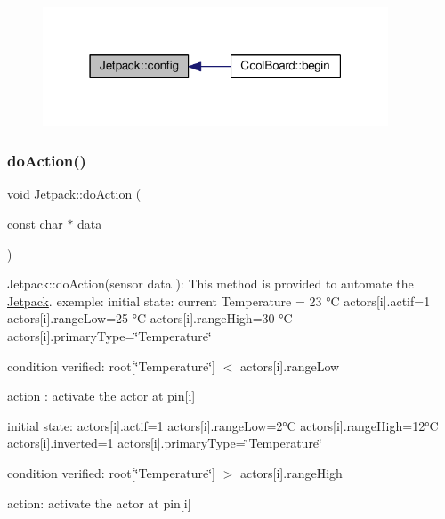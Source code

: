 \begin{figure}[H]
\begin{center}
\leavevmode
\includegraphics[width=291pt]{df/d1d/class_jetpack_ab065ee83e244265a2223a22f3ee4a719_icgraph}
\end{center}
\end{figure}
\mbox{\label{class_jetpack_a9e703197093094b963f9ad57817495b8}} 
\subsubsection{\texorpdfstring{do\+Action()}{doAction()}}
{\footnotesize\ttfamily void Jetpack\+::do\+Action (\begin{DoxyParamCaption}\item[{const char $\ast$}]{data }\end{DoxyParamCaption})}

Jetpack\+::do\+Action(sensor data )\+: This method is provided to automate the \hyperlink{class_jetpack}{Jetpack}. exemple\+: initial state\+: current Temperature = 23 °C actors\mbox{[}i\mbox{]}.actif=1 actors\mbox{[}i\mbox{]}.range\+Low=25 °C actors\mbox{[}i\mbox{]}.range\+High=30 °C actors\mbox{[}i\mbox{]}.primary\+Type=\char`\"{}\+Temperature\char`\"{}

condition verified\+: root\mbox{[}\char`\"{}\+Temperature\char`\"{}\mbox{]} $<$ actors\mbox{[}i\mbox{]}.range\+Low

action \+: activate the actor at pin\mbox{[}i\mbox{]}

initial state\+: actors\mbox{[}i\mbox{]}.actif=1 actors\mbox{[}i\mbox{]}.range\+Low=2°C actors\mbox{[}i\mbox{]}.range\+High=12°C actors\mbox{[}i\mbox{]}.inverted=1 actors\mbox{[}i\mbox{]}.primary\+Type=\char`\"{}\+Temperature\char`\"{}

condition verified\+: root\mbox{[}\char`\"{}\+Temperature\char`\"{}\mbox{]} $>$ actors\mbox{[}i\mbox{]}.range\+High

action\+: activate the actor at pin\mbox{[}i\mbox{]}

